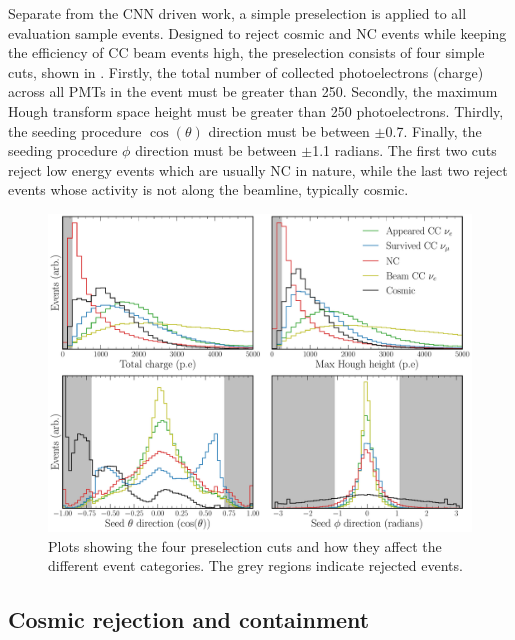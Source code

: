 Separate from the CNN driven work, a simple preselection is applied to all evaluation sample
events. Designed to reject cosmic and NC events while keeping the efficiency of CC beam events
high, the preselection consists of four simple cuts, shown in .
Firstly, the total number of collected photoelectrons (charge) across all PMTs in the event must
be greater than 250. Secondly, the maximum Hough transform space height must be greater than 250
photoelectrons. Thirdly, the seeding procedure $\cos(\theta)$ direction must be between $\pm$0.7.
Finally, the seeding procedure $\phi$ direction must be between $\pm$1.1 radians. The first two
cuts reject low energy events which are usually NC in nature, while the last two reject events
whose activity is not along the beamline, typically cosmic.

\begin{figure} %
    \includegraphics[width=\textwidth]{diagrams/7-results/explore_simple_cuts.pdf}
    \caption[Plots detailing evaluation sample preselection cuts]
    {Plots showing the four preselection cuts and how they affect the different event categories.
        The grey regions indicate rejected events.}
    \label{fig:explore_simple_cuts}
\end{figure}

\subsection{Cosmic rejection and containment} %
\label{sec:results_eval_cosmic} %

